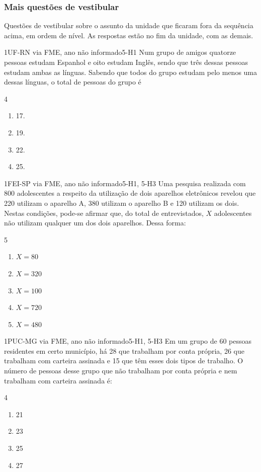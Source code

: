 \subsubsection*{Mais questões de vestibular}
Questões de vestibular sobre o assunto da unidade que ficaram fora da sequência acima, em ordem de nível. As respostas estão no fim da unidade, com as demais.

\begin{questao}{1}{UF-RN via FME, ano não informado}{5-H1}\label{u5:ufrn17}
Num grupo de amigos quatorze pessoas estudam Espanhol e oito estudam Inglês, sendo que três dessas pessoas estudam ambas as línguas. Sabendo que todos do grupo estudam pelo menos uma dessas línguas, o total de pessoas do grupo é
\begin{multicols}{4}
\begin{enumerate}[label=\alph*)]
  \item 17.
  \item 19.
  \item 22.
  \item 25.
\end{enumerate}
\end{multicols}
\end{questao}

\begin{questao}{1}{FEI-SP via FME, ano não informado}{5-H1, 5-H3}\label{u5:fei15}
Uma pesquisa realizada com 800 adolescentes a respeito da utilização de dois aparelhos eletrônicos revelou que 220 utilizam o aparelho A, 380 utilizam o aparelho B e 120 utilizam os dois. Nestas condições, pode-se afirmar que, do total de entrevistados, $X$ adolescentes não utilizam qualquer um dos dois aparelhos. Dessa forma:
\begin{multicols}{5}
\begin{enumerate}[label=\alph*)]
  \item $X=80$
  \item $X=320$
  \item $X=100$
  \item $X=720$
  \item $X=480$
\end{enumerate}
\end{multicols}
\end{questao}

\begin{questao}{1}{PUC-MG via FME, ano não informado}{5-H1, 5-H3}\label{u5:pucmg16}
Em um grupo de 60 pessoas residentes em certo município, há 28 que trabalham por conta própria, 26 que trabalham com carteira assinada e 15 que têm esses dois tipos de trabalho. O número de pessoas desse grupo que não trabalham por conta própria e nem trabalham com carteira assinada é:
\begin{multicols}{4}
\begin{enumerate}[label=\alph*)]
  \item 21
  \item 23
  \item 25
  \item 27
\end{enumerate}
\end{multicols}
\end{questao}

